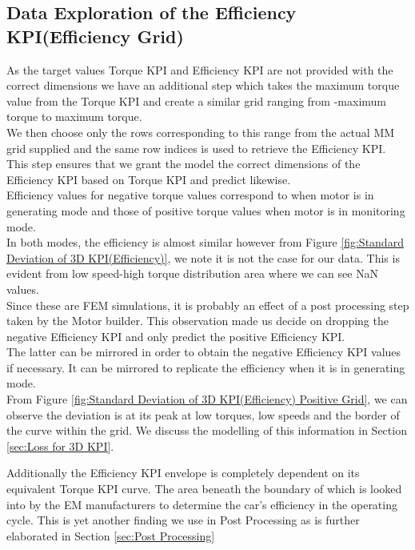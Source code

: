 \documentclass{report} %
\begin{document}
\subsection{Data Exploration of the Efficiency \ac{KPI}(Efficiency Grid)}\label{sec:Deep Dive into 3D KPI}

As the target values Torque \ac{KPI} and Efficiency \ac{KPI} are not provided with the correct dimensions we have an additional step which takes the maximum torque value from the Torque \ac{KPI} and create a similar grid ranging from -maximum torque to maximum torque. \\
We then choose only the rows corresponding to this range from the actual MM grid supplied and the same row indices is used to retrieve the Efficiency \ac{KPI}. \\
This step ensures that we grant the model the correct dimensions of the Efficiency \ac{KPI} based on Torque \ac{KPI} and predict likewise.\\

Efficiency values for negative torque values correspond to when motor is in generating mode and those of positive torque values when motor is in monitoring mode.\\
In both modes, the efficiency is almost similar however from Figure \ref{fig:Standard Deviation of 3D KPI(Efficiency)}, we note it is not the case for our data. 
This is evident from low speed-high torque distribution area where we can see \ac{NaN} values.\\
Since these are \ac{FEM} simulations, it is probably an effect of a post processing step taken by the Motor builder.
This observation made us decide on dropping the negative Efficiency \ac{KPI} and only predict the positive Efficiency \ac{KPI}.\\
The latter can be mirrored in order to obtain the negative Efficiency \ac{KPI} values if necessary.
It can be mirrored to replicate the efficiency when it is in generating mode.\\

From Figure \ref{fig:Standard Deviation of 3D KPI(Efficiency) Positive Grid}, we can observe the deviation is at its peak at low torques, low speeds and the border of the curve within the grid.
We discuss the modelling of this information in Section \ref{sec:Loss for 3D KPI}.

Additionally the Efficiency \ac{KPI} envelope is completely dependent on its equivalent Torque \ac{KPI} curve. 
The area beneath the boundary of which is looked into by the \ac{EM} manufacturers to determine the car's efficiency in the operating cycle.
This is yet another finding we use in Post Processing as is further elaborated in Section \ref{sec:Post Processing}
\end{document}
